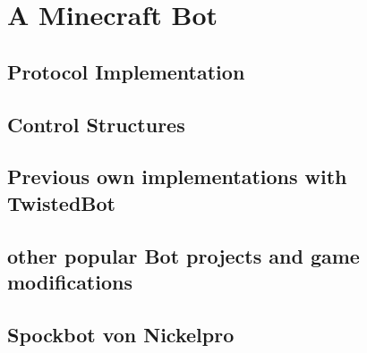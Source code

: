 \chapter{A Minecraft Bot}

\section{Protocol Implementation}

\section{Control Structures}

\section{Previous own implementations with TwistedBot}

\section{other popular Bot projects and game modifications}

\section{Spockbot von Nickelpro}